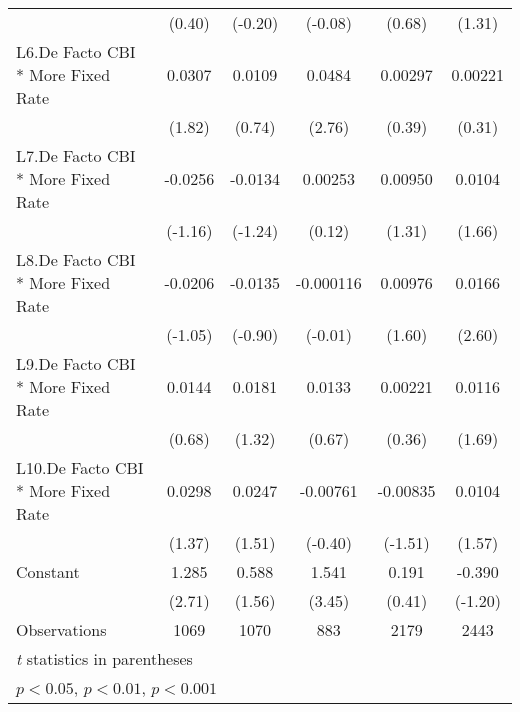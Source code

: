 {\begin{longtable}{l*{5}{c}}
                &   (0.40)         &  (-0.20)         &  (-0.08)         &   (0.68)         &   (1.31)         \\
[1em]
L6.De Facto CBI * More Fixed Rate&   0.0307         &   0.0109         &   0.0484\sym{**} &  0.00297         &  0.00221         \\
                &   (1.82)         &   (0.74)         &   (2.76)         &   (0.39)         &   (0.31)         \\
[1em]
L7.De Facto CBI * More Fixed Rate&  -0.0256         &  -0.0134         &  0.00253         &  0.00950         &   0.0104         \\
                &  (-1.16)         &  (-1.24)         &   (0.12)         &   (1.31)         &   (1.66)         \\
[1em]
L8.De Facto CBI * More Fixed Rate&  -0.0206         &  -0.0135         &-0.000116         &  0.00976         &   0.0166\sym{*}  \\
                &  (-1.05)         &  (-0.90)         &  (-0.01)         &   (1.60)         &   (2.60)         \\
[1em]
L9.De Facto CBI * More Fixed Rate&   0.0144         &   0.0181         &   0.0133         &  0.00221         &   0.0116         \\
                &   (0.68)         &   (1.32)         &   (0.67)         &   (0.36)         &   (1.69)         \\
[1em]
L10.De Facto CBI * More Fixed Rate&   0.0298         &   0.0247         & -0.00761         & -0.00835         &   0.0104         \\
                &   (1.37)         &   (1.51)         &  (-0.40)         &  (-1.51)         &   (1.57)         \\
[1em]
Constant        &    1.285\sym{**} &    0.588         &    1.541\sym{***}&    0.191         &   -0.390         \\
                &   (2.71)         &   (1.56)         &   (3.45)         &   (0.41)         &  (-1.20)         \\
\hline
Observations    &     1069         &     1070         &      883         &     2179         &     2443         \\
\hline\hline
\multicolumn{6}{l}{\footnotesize \textit{t} statistics in parentheses}\\
\multicolumn{6}{l}{\footnotesize \sym{*} \(p<0.05\), \sym{**} \(p<0.01\), \sym{***} \(p<0.001\)}\\
\end{longtable}
}
